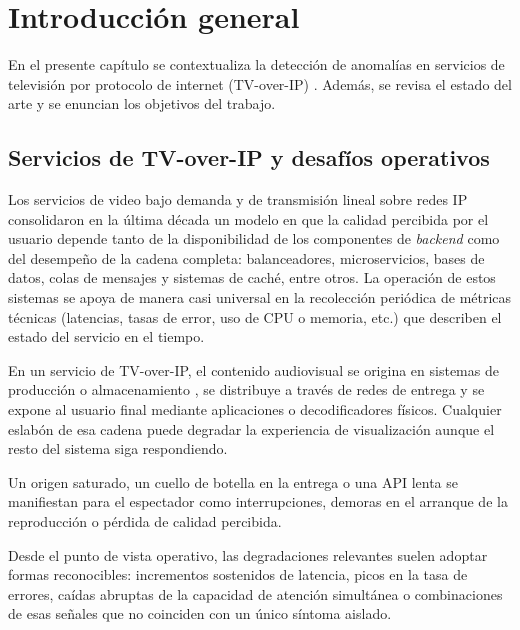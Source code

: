
\chapter{Introducción general}
\label{Chapter1}
\label{IntroGeneral}

En el presente capítulo se contextualiza la detección de anomalías en servicios de televisión por protocolo de internet (TV-over-IP) \citep{itu_iptv_overview}. Además, se revisa el estado del arte y se enuncian los objetivos del trabajo.

\section{Servicios de TV-over-IP y desafíos operativos}

Los servicios de video bajo demanda y de transmisión lineal sobre redes IP consolidaron en la última década un modelo en que la calidad percibida por el usuario depende tanto de la disponibilidad de los componentes de \textit{backend} como del desempeño de la cadena completa: balanceadores, microservicios, bases de datos, colas de mensajes y sistemas de caché, entre otros. La operación de estos sistemas se apoya de manera casi universal en la recolección periódica de métricas técnicas (latencias, tasas de error, uso de CPU o memoria, etc.) que describen el estado del servicio en el tiempo.

En un servicio de TV-over-IP, el contenido audiovisual se origina en sistemas de producción o almacenamiento \citep{itu_iptv_overview}, se distribuye a través de redes de entrega y se expone al usuario final mediante aplicaciones o decodificadores físicos. Cualquier eslabón de esa cadena puede degradar la experiencia de visualización aunque el resto del sistema siga respondiendo.

Un origen saturado, un cuello de botella en la entrega o una API lenta se manifiestan para el espectador como interrupciones, demoras en el arranque de la reproducción o pérdida de calidad percibida. 

Desde el punto de vista operativo, las degradaciones relevantes suelen adoptar formas reconocibles: incrementos sostenidos de latencia, picos en la tasa de errores, caídas abruptas de la capacidad de atención simultánea o combinaciones de esas señales que no coinciden con un único síntoma aislado.

